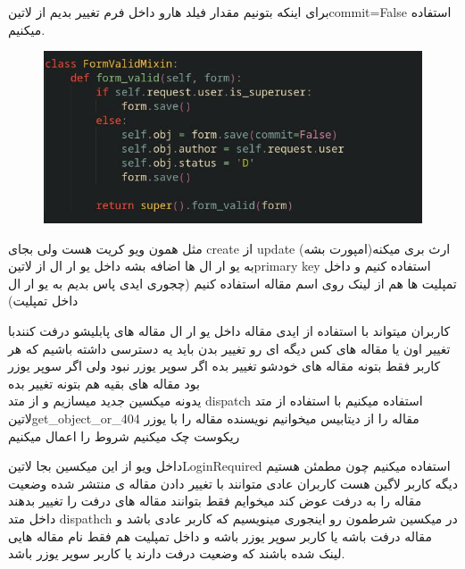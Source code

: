 \documentclass{article}
\begin{document}
			برای اینکه بتونیم مقدار فیلد هارو داخل فرم تغییر بدیم از ‌لاتین{commit=False} استفاده میکنیم. 
		
		\begin{figure}[h!]
			\includegraphics[width=\linewidth]{mehran-tarif-course-code-pic/FormValidMixinPic.jpg}
		\end{figure}
	
		مثل همون ویو کریت هست ولی بجای create از update ارث بری میکنه(امپورت بشه) به یو ار ال ها اضافه بشه داخل یو ار ال از
		 ‌لاتین{primary key} استفاده کنیم و داخل تمپلیت ها هم از لینک روی اسم مقاله استفاده کنیم (چجوری ایدی پاس بدیم به یو ار ال داخل 
		 تمپلیت) 
	
	 کاربران میتواند با استفاده از ایدی مقاله داخل یو ار ال مقاله های پابلیشو درفت کنندبا تغییر اون یا مقاله های کس دیگه ای رو تغییر بدن
	 باید یه دسترسی داشته باشیم که هر کاربر فقط بتونه مقاله های خودشو تغییر بده اگر سوپر یوزر نبود ولی اگر سوپر یوزر بود مقاله های بقیه هم
	 بتونه تغییر بده\\
	 	 یدونه میکسین جدید میسازیم و از متد dispatch استفاده میکنیم
	 	 با استفاده از متد ‌لاتین{get\_object\_or\_404} مقاله را از دیتابیس میخوانیم
	 	 نویسنده مقاله را با یوزر ریکوست چک میکنیم 
	 	 شروط را اعمال میکنیم
	 	
	 	داخل ویو از این میکسین بجا ‌لاتین{LoginRequired} استفاده میکنیم چون مطمئن هستیم دیگه کاربر لاگین هست
	 کاربران عادی متوانند با تغییر دادن مقاله ی منتشر شده وضعیت مقاله را به درفت عوض کند میخوایم فقط بتوانند مقاله های درفت را تغییر
	 بدهند\\
	 	داخل متد dispathch در میکسین شرطمون رو اینجوری مینویسیم که کاربر عادی باشد و مقاله درفت باشه یا کاربر سوپر یوزر باشه و داخل
	 	تمپلیت هم فقط نام مقاله هایی لینک شده باشند که وضعیت درفت دارند یا کاربر سوپر یوزر باشد.
	 	
\end{document}
